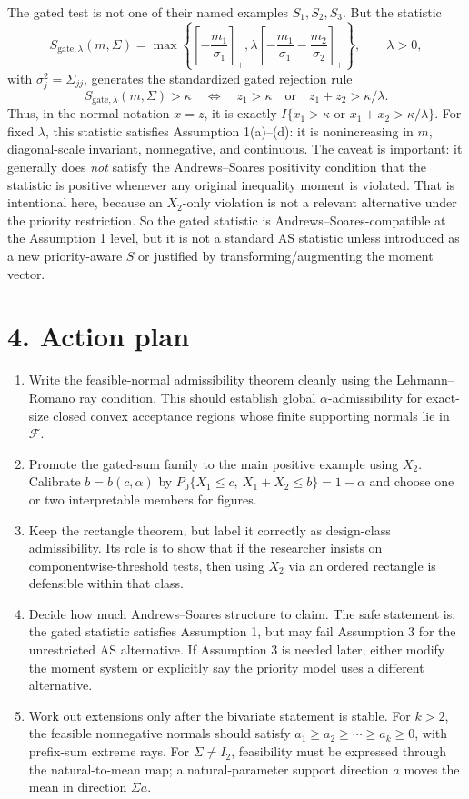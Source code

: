 \documentclass[10pt]{article}
\begin{document}
The gated test is not one of their named examples $S_1,S_2,S_3$.  But the statistic
\[
S_{\mathrm{gate},\lambda}(m,\Sigma)
=
\max\left\{
\left[-\frac{m_1}{\sigma_1}\right]_+,
\lambda\left[-\frac{m_1}{\sigma_1}-\frac{m_2}{\sigma_2}\right]_+
\right\},
\qquad \lambda>0,
\]
with $\sigma_j^2=\Sigma_{jj}$, generates the standardized gated rejection rule
\[
S_{\mathrm{gate},\lambda}(m,\Sigma)>\kappa
\quad\Longleftrightarrow\quad
z_1>\kappa\quad\text{or}\quad z_1+z_2>\kappa/\lambda.
\]
Thus, in the normal notation $x=z$, it is exactly $I\{x_1>\kappa\text{ or }x_1+x_2>\kappa/\lambda\}$.  For fixed $\lambda$, this statistic satisfies Assumption 1(a)--(d): it is nonincreasing in $m$, diagonal-scale invariant, nonnegative, and continuous.  The caveat is important: it generally does \emph{not} satisfy the Andrews--Soares positivity condition that the statistic is positive whenever any original inequality moment is violated.  That is intentional here, because an $X_2$-only violation is not a relevant alternative under the priority restriction.  So the gated statistic is Andrews--Soares-compatible at the Assumption 1 level, but it is not a standard AS statistic unless introduced as a new priority-aware $S$ or justified by transforming/augmenting the moment vector.

\section*{4. Action plan}

\begin{enumerate}
\item Write the feasible-normal admissibility theorem cleanly using the Lehmann--Romano ray condition.  This should establish global $\alpha$-admissibility for exact-size closed convex acceptance regions whose finite supporting normals lie in $\mathcal F$.
\item Promote the gated-sum family to the main positive example using $X_2$.  Calibrate $b=b(c,\alpha)$ by $P_0\{X_1\le c,\ X_1+X_2\le b\}=1-\alpha$ and choose one or two interpretable members for figures.
\item Keep the rectangle theorem, but label it correctly as design-class admissibility.  Its role is to show that if the researcher insists on componentwise-threshold tests, then using $X_2$ via an ordered rectangle is defensible within that class.
\item Decide how much Andrews--Soares structure to claim.  The safe statement is: the gated statistic satisfies Assumption 1, but may fail Assumption 3 for the unrestricted AS alternative.  If Assumption 3 is needed later, either modify the moment system or explicitly say the priority model uses a different alternative.
\item Work out extensions only after the bivariate statement is stable.  For $k>2$, the feasible nonnegative normals should satisfy $a_1\ge a_2\ge\cdots\ge a_k\ge0$, with prefix-sum extreme rays.  For $\Sigma\ne I_2$, feasibility must be expressed through the natural-to-mean map; a natural-parameter support direction $a$ moves the mean in direction $\Sigma a$.
\end{enumerate}
\end{document}
